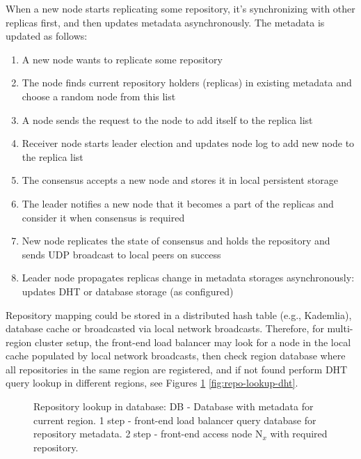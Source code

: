 \documentclass[acmlarge, screen, nonacm]{acmart}
\begin{document}
When a new node starts replicating some repository, it's synchronizing with other replicas first, and then
updates metadata asynchronously. The metadata is updated as follows:
\begin{enumerate}
  \item A new node wants to replicate some repository
  \item The node finds current repository holders (replicas) in existing metadata and choose a random node from this list
  \item A node sends the request to the node to add itself to the replica list
  \item Receiver node starts leader election and updates node log to add new node to the replica list
  \item The consensus accepts a new node and stores it in local persistent storage
  \item The leader notifies a new node that it becomes a part of the replicas and consider it when consensus is required
  \item New node replicates the state of consensus and holds the repository and sends UDP broadcast to
    local peers on success
  \item Leader node propagates replicas change in metadata storages asynchronously: updates DHT or database storage
    (as configured)
\end{enumerate}

Repository mapping could be stored in a distributed hash table (e.g., Kademlia),
database cache or broadcasted via local network broadcasts.
Therefore, for multi-region cluster setup, the front-end load balancer may look for a node in the local cache
populated by local network broadcasts, then check region database where all repositories in the same region are
registered, and if not found perform DHT query lookup in different regions,
see Figures \ref{fig:repo-lookup-db} \ref{fig:repo-lookup-dht}.

\begin{figure}
  \begin{center}
  \end{center}
  \caption{
    Repository lookup in database:
    DB - Database with metadata for current region.
    1 step - front-end load balancer query database for repository metadata.
    2 step - front-end access node N$_{x}$ with required repository.
  }
  \label{fig:repo-lookup-db}
\end{figure}
\end{document}
